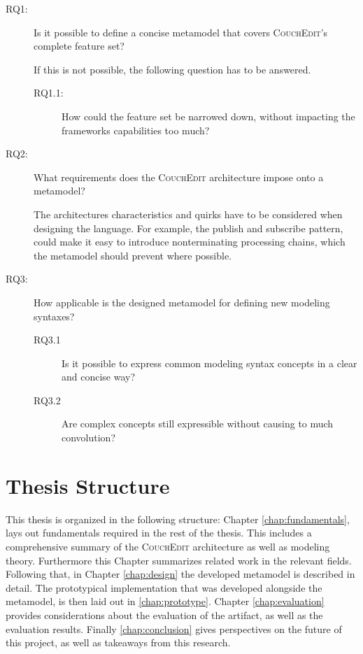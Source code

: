 \begin{description} 
  \item[RQ1:]  Is it possible to define a concise metamodel that covers \textsc{CouchEdit}'s complete feature set?

        If this is not possible, the following question has to be answered.
        \begin{description}
          \item[RQ1.1:] How could the feature set be narrowed down, without impacting the frameworks capabilities too much?
        \end{description}

  \item[RQ2:] What requirements does the \textsc{CouchEdit} architecture impose onto a metamodel?

        The architectures characteristics and quirks have to be considered when designing the language. For example, the publish and subscribe pattern, could make it easy to introduce nonterminating processing chains, which the metamodel should prevent where possible.

  \item[RQ3:] How applicable is the designed metamodel for defining new modeling syntaxes?

        \begin{description}
          \item[RQ3.1] Is it possible to express common modeling syntax concepts in a clear and concise way?
          \item[RQ3.2] Are complex concepts still expressible without causing to much convolution?
        \end{description}
\end{description}



\section{Thesis Structure}
This thesis is organized in the following structure: Chapter \ref{chap:fundamentals}, lays out fundamentals required in the rest of the thesis. This includes a comprehensive summary of the \textsc{CouchEdit} architecture as well as modeling theory. Furthermore this Chapter summarizes related work in the relevant fields. Following that, in Chapter \ref{chap:design} the developed metamodel is described in detail. The prototypical implementation that was developed alongside the metamodel, is then laid out in \ref{chap:prototype}. Chapter \ref{chap:evaluation} provides considerations about the evaluation of the artifact, as well as the evaluation results. Finally \ref{chap:conclusion} gives perspectives on the future of this project, as well as takeaways from this research.